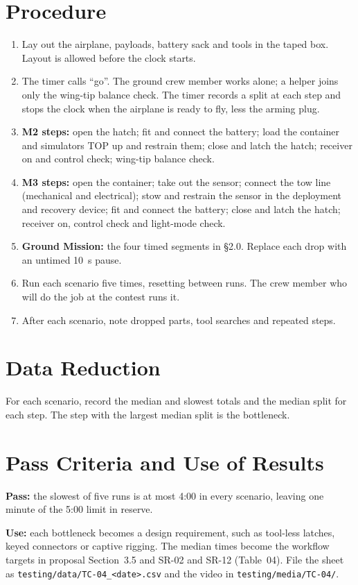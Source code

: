 \documentclass[final]{dbfdoc}
\begin{document}
\section{Procedure}
\begin{enumerate}
\item Lay out the airplane, payloads, battery sack and tools in the taped box. Layout is allowed before the clock starts.
\item The timer calls ``go''. The ground crew member works alone; a helper joins only the wing-tip balance check. The timer records a split at each step and stops the clock when the airplane is ready to fly, less the arming plug.
\item \textbf{M2 steps:} open the hatch; fit and connect the battery; load the container and simulators TOP up and restrain them; close and latch the hatch; receiver on and control check; wing-tip balance check.
\item \textbf{M3 steps:} open the container; take out the sensor; connect the tow line (mechanical and electrical); stow and restrain the sensor in the deployment and recovery device; fit and connect the battery; close and latch the hatch; receiver on, control check and light-mode check.
\item \textbf{Ground Mission:} the four timed segments in §2.0. Replace each drop with an untimed 10~s pause.
\item Run each scenario five times, resetting between runs. The crew member who will do the job at the contest runs it.
\item After each scenario, note dropped parts, tool searches and repeated steps.
\end{enumerate}

\section{Data Reduction}
For each scenario, record the median and slowest totals and the median split for each step. The step with the largest median split is the bottleneck.

\section{Pass Criteria and Use of Results}
\textbf{Pass:} the slowest of five runs is at most 4:00 in every scenario, leaving one minute of the 5:00 limit in reserve.

\textbf{Use:} each bottleneck becomes a design requirement, such as tool-less latches, keyed connectors or captive rigging. The median times become the workflow targets in proposal Section~3.5 and \mbox{SR-02} and \mbox{SR-12} (Table~04). File the sheet as \texttt{testing/data/TC-04\_<date>.csv} and the video in \texttt{testing/media/TC-04/}.
\end{document}

